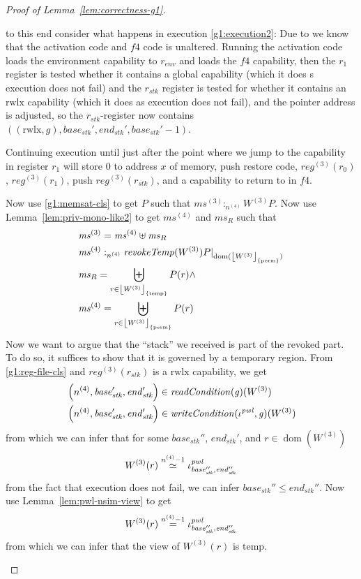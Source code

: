 \documentclass[a4paper]{article}
\DeclarePairedDelimiter\floor{\lfloor}{\rfloor}
\newcommand{\nequal}[1][n]{\stackrel{\tiny{#1}}{=}}
\renewcommand{\nsim}[1][n]{\stackrel{\tiny{#1}}{\simeq}}
\DeclareMathOperator{\dom}{dom}
\newcommand{\var}[1]{\mathit{#1}}
\newcommand{\hs}{\var{ms}}
\newcommand{\ms}{\hs}
\newcommand{\gl}{\var{g}}
\newcommand{\start}{\var{base}}
\newcommand{\addrend}{\var{end}}
\newcommand{\reg}{\var{reg}}
\newcommand{\heap}{\var{mem}}
\newcommand{\stk}{\var{stk}}
\newcommand{\pwl}{\var{pwl}}
\newcommand{\plainfun}[2]{
  \ifthenelse{\equal{#2}{}}
  {\mathit{#1}}
  {\mathit{#1}(#2)}
}
\newcommand{\readCond}[1]{\plainfun{readCondition}{#1}}
\newcommand{\writeCond}[1]{\plainfun{writeCondition}{#1}}
\newcommand{\revokeTemp}[1]{\plainfun{revokeTemp}{#1}}
\newcommand{\erase}[2]{\floor*{#1}_{\{#2\}}}
\newcommand{\heapSat}[3][\heap]{#1 :_{#2} #3}
\newcommand{\memSat}[3][n]{\heapSat[#2]{#1}{#3}}
\newcommand{\npair}[2][n]{\left(#1,#2 \right)}
\newcommand{\plainperm}[1]{\mathrm{#1}}
\newcommand{\rwlx}{\plainperm{rwlx}}
\newcommand{\plainview}[1]{\mathrm{#1}}
\newcommand{\perma}{\plainview{perm}}
\newcommand{\temp}{\plainview{temp}}
\begin{document}
\begin{proof}[Proof of Lemma~\ref{lem:correctness-g1}]
\begin{enumproof}
\begin{enumproof}
\begin{enumproof}
\begin{enumproof}
\begin{equation}
          \end{equation}
          to this end consider what happens in execution \ref{g1:execution2}: Due to \label{g1:memsat-cls} we know that the activation code and $f4$ code is unaltered. Running the activation code loads the environment capability to $r_{\var{env}}$ and loads the $f4$ capability, then the $r_1$ register is tested whether it contains a global capability (which it does s execution does not fail) and the $r_\stk$ register is tested for whether it contains an $\rwlx$ capability (which it does as execution does not fail), and the pointer address is adjusted, so the $r_\stk$-register now contains $((\rwlx, \gl), \start_{\stk}', \addrend_{\stk}', \start_{\stk}'-1)$.

          Continuing execution until just after the point where we jump to the capability in register $r_1$ will store $0$ to address $x$ of memory, push restore code, $\reg^{(3)}(r_0)$, $\reg^{(3)}(r_1)$, push $\reg^{(3)}(r_\stk)$, and a capability to return to in $f4$.

          Now use \ref{g1:memsat-cls} to get $P$ such that $\memSat[n^{(4)}]{\ms^{(3)}}{W^{(3)}}{P}$. Now use Lemma~\ref{lem:priv-mono-like2} to get $\ms^{(4)}$ and $\ms_R$ such that
          \begin{align*}
            & \ms^{(3)} = \ms^{(4)} \uplus \ms_R \\
            & \memSat[n^{(4)}]{\ms^{(4)}}{\revokeTemp{W^{(3)}}}{P|_{\dom(\erase{W^{(3)}}{\perma})}} \\
            & \ms_R = \biguplus_{r \in \erase{W^{(3)}}{\temp}} P(r) \land \\
            & \ms^{(4)} = \biguplus_{r \in \erase{W^{(3)}}{\perma}} P(r)
          \end{align*}
          Now we want to argue that the ``stack'' we received is part of the revoked part. To do so, it suffices to show that it is governed by a temporary region. From \ref{g1:reg-file-cls} and $\reg^{(3)}(r_\stk)$ is a $\rwlx$ capability, we get
          \begin{align*}
            &\npair[n^{(4)}]{\start_\stk',\addrend_\stk'} \in \readCond{}(\gl)(W^{(3)}) \\
            &\npair[n^{(4)}]{\start_\stk',\addrend_\stk'} \in \writeCond{}(\iota^\pwl,\gl)(W^{(3)})
          \end{align*}
          from which we can infer that for some $\start_\stk''$, $\addrend_\stk'$, and $r\in\dom(W^{(3)})$
          \[
            W^{(3)}(r) \nsim[n^{(4)}-1] \iota^\pwl_{\start_\stk'',\addrend_\stk''}
          \]
          from the fact that execution does not fail, we can infer $\start_\stk'' \leq \addrend_\stk''$. Now use Lemma~\ref{lem:pwl-nsim-view} to get
          \[
            W^{(3)}(r) \nequal[n^{(4)}-1] \iota^\pwl_{\start_\stk'',\addrend_\stk''}
          \]
          from which we can infer that the view of $W^{(3)}(r)$ is $\temp$.


\end{enumproof}
\end{enumproof}
\end{enumproof}
\end{enumproof}
\end{proof}
\end{document}
